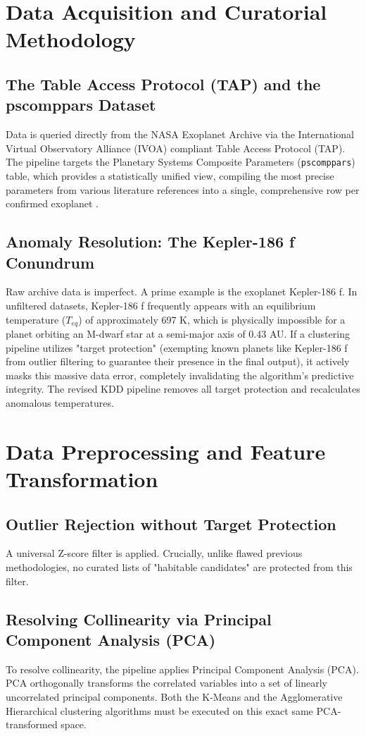 \section{Data Acquisition and Curatorial Methodology}
\subsection{The Table Access Protocol (TAP) and the pscomppars Dataset}
Data is queried directly from the NASA Exoplanet Archive via the International Virtual Observatory Alliance (IVOA) compliant Table Access Protocol (TAP). The pipeline targets the Planetary Systems Composite Parameters (\texttt{pscomppars}) table, which provides a statistically unified view, compiling the most precise parameters from various literature references into a single, comprehensive row per confirmed exoplanet \cite{pscomppars_table}.

\subsection{Anomaly Resolution: The Kepler-186 f Conundrum}
Raw archive data is imperfect. A prime example is the exoplanet Kepler-186 f. In unfiltered datasets, Kepler-186 f frequently appears with an equilibrium temperature ($T_{eq}$) of approximately 697 K, which is physically impossible for a planet orbiting an M-dwarf star at a semi-major axis of 0.43 AU. If a clustering pipeline utilizes "target protection" (exempting known planets like Kepler-186 f from outlier filtering to guarantee their presence in the final output), it actively masks this massive data error, completely invalidating the algorithm's predictive integrity. The revised KDD pipeline removes all target protection and recalculates anomalous temperatures.

\section{Data Preprocessing and Feature Transformation}
\subsection{Outlier Rejection without Target Protection}
A universal Z-score filter is applied. Crucially, unlike flawed previous methodologies, no curated lists of "habitable candidates" are protected from this filter.

\subsection{Resolving Collinearity via Principal Component Analysis (PCA)}
To resolve collinearity, the pipeline applies Principal Component Analysis (PCA). PCA orthogonally transforms the correlated variables into a set of linearly uncorrelated principal components. Both the K-Means and the Agglomerative Hierarchical clustering algorithms must be executed on this exact same PCA-transformed space.

